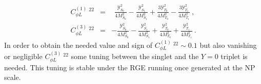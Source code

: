 \begin{eqnarray} 
	\label{eq:matching_CHL}
	C_{\phi L}^{(1)}\ ^{22 } & = &
	\ \ \frac{ \mathcal{Y}^{2}_{S_{0}}}{4 M_{S_{0}}^2} 
	- \frac{ \mathcal{Y}^{2}_{S_{1}}}{4 M_{S_{1}}^2}
	+ \frac{ 3 \mathcal{Y}^{2}_{T_{0}}}{4 M_{T_{0}}^2}
	- \frac{ 3 \mathcal{Y}^{2}_{T_{1}}}{4 M_{T_{1}}^2} \ , \\
	C_{\phi L}^{(3)} \ ^ {22} & = & 
	- \frac{ \mathcal{Y}^{2}_{S_{0}}}{4 M_{S_{0}}^2}
	- \frac{ \mathcal{Y}^{2}_{S_{1}}}{4 M_{S_{1}}^2}
	+ \frac{ \mathcal{Y}^{2}_{T_{0}}}{4 M_{T_{0}}^2}
	+ \frac{ \mathcal{Y}^{2}_{T_{1}}}{4 M_{T_{1}}^2} \ . \nonumber
\end{eqnarray}
In order to obtain the needed value and sign of  $C_{\phi L}^{(1)}\ ^{22} \sim 0.1$ but also vanishing or negligible  $C_{\phi L}^{(3)}\ ^{22}$ some tuning between the singlet and the $Y=0$ triplet is needed. This tuning is stable under the RGE running once generated at the NP scale. 
